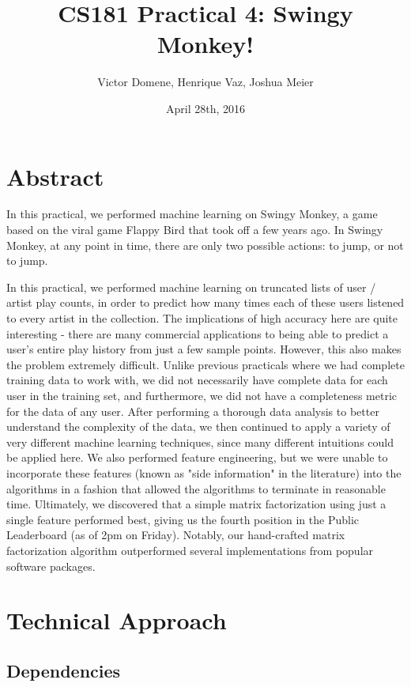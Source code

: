 \documentclass[10pt]{article}
\title{CS181 Practical 4: Swingy Monkey!}
\author{Victor Domene, Henrique Vaz, Joshua Meier}
\date{April 28th, 2016}
\begin{document}
\maketitle

\section{Abstract} 

In this practical, we performed machine learning on Swingy Monkey, a game
based on the viral game Flappy Bird that took off a few years ago.
In Swingy Monkey, at any point in time, there are only two possible actions:
to jump, or not to jump. 

In this practical, we performed machine learning on
truncated lists of user / artist play counts, in order to predict how many
times each of these users listened to every artist in the collection. The
implications of high accuracy here are quite interesting - there are many
commercial applications to being able to predict a user's entire play history
from just a few sample points. However, this also makes the problem extremely
difficult. Unlike previous practicals where we had complete training data to
work with, we did not necessarily have complete data for each user in the
training set, and furthermore, we did not have a completeness metric for the
data of any user. After performing a thorough data analysis to better
understand the complexity of the data, we then continued to apply a variety of
very different machine learning techniques, since many different intuitions
could be applied here. We also performed feature engineering, but we were
unable to incorporate these features (known as "side information" in the
literature) into the algorithms in a fashion that allowed the algorithms to
terminate in reasonable time. Ultimately, we discovered that a simple matrix
factorization using just a single feature performed best, giving us the fourth
position in the Public Leaderboard (as of 2pm on Friday). Notably, our
hand-crafted matrix factorization algorithm outperformed several
implementations from popular software packages. 

\section{Technical Approach} 

\subsection{Dependencies}
\end{document}
